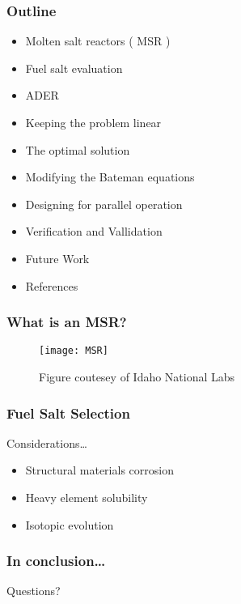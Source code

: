 \documentclass{beamer}
\title[Modelling of Material Transfers in Reactor Fuel Burnup Simulations]
\author{Daniel D. Wooten}
\institute{UC Berkeley}
\date{October 20\textsuperscript{th}, 2017}
\begin{document}
\frame{\titlepage}

\begin{frame}

\frametitle{Outline}

    \begin{itemize}
        \item Molten salt reactors ( MSR ) 
        \item Fuel salt evaluation 
        \item ADER
        \item Keeping the problem linear
        \item The optimal solution
        \item Modifying the Bateman equations
        \item Designing for parallel operation
        \item Verification and Vallidation
        \item Future Work
        \item References
    \end{itemize}

\end{frame}

\begin{frame}
\frametitle{What is an MSR?}

    \begin{figure}
        \centering
        \texttt{[image: MSR]}
        \caption{Figure coutesey of Idaho National Labs}
        \label{fig:msr_pic}
    \end{figure}

\end{frame}

\begin{frame}
\frametitle{Fuel Salt Selection}

Considerations\ldots

    \begin{itemize}
        \item Structural materials corrosion 
        \item Heavy element solubility
        \item Isotopic evolution
    \end{itemize}

\end{frame}

\begin{frame}
\frametitle{In conclusion\ldots}

    Questions?

\end{frame}
\end{document}
